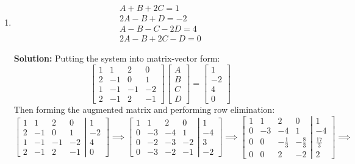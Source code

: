 \documentclass[letterpaper, 11pt]{article}
\begin{document}
\begin{enumerate}
\item
\begin{gather*}
A + B + 2C = 1\\
2A - B + D = -2\\
A - B - C - 2D = 4\\
2A - B + 2C - D = 0 
\end{gather*}
\par \textbf{Solution:} Putting the system into matrix-vector form:
\[ \left[ \begin{array}{cccc} 1 & 1 & 2 & 0 \\ 2 & -1 & 0 & 1 \\ 1 & -1 & -1 & -2 \\ 2 & -1 & 2 & -1 \end{array} \right] \left[ \begin{array}{c} A \\ B \\ C \\ D \end{array} \right] = 
\left[ \begin{array}{c} 1 \\ -2 \\ 4 \\ 0 \end{array} \right] \]
Then forming the augmented matrix and performing row elimination:
\[ \left[ \begin{array}{cccc} 1 & 1 & 2 & 0 \\ 2 & -1 & 0 & 1 \\ 1 & -1 & -1 & -2 \\ 2 & -1 & 2 & -1 \end{array} \right| \left. \begin{array}{c} 1 \\ -2 \\ 4 \\ 0 \end{array} \right] \implies 
\left[ \begin{array}{cccc} 1 & 1 & 2 & 0 \\ 0 & -3 & -4 & 1 \\ 0 & -2 & -3 & -2 \\ 0 & -3 & -2 & -1 \end{array} \right| \left. \begin{array}{c} 1 \\ -4 \\ 3 \\ -2 \end{array} \right] \implies 
\left[ \begin{array}{cccc} 1 & 1 & 2 & 0 \\ 0 & -3 & -4 & 1 \\ 0 & 0 & -\frac{1}{3} & -\frac{8}{3} \\ 0 & 0 & 2 & -2 \end{array} \right| \left. \begin{array}{c} 1 \\ -4 \\ \frac{17}{3} \\ 2 \end{array} \right] \implies 
\]
\end{enumerate}
\end{document}
